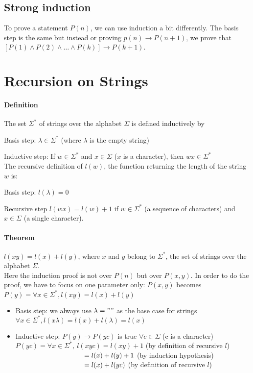 \documentclass[10pt,a4paper]{book}
\begin{document}
\subsection{Strong induction}
To prove a statement $P(n)$, we can use induction a bit differently. The basis step is the same but instead or proving $p(n)\to P(n+1)$, we prove that $[P(1)\land P(2)\land\ldots\land P(k)]\to P(k+1)$.
\section{Recursion on Strings}
\paragraph*{Definition}
The set $\Sigma^{*}$ of strings over the alphabet $\Sigma$ is defined inductively by\par
Basis step: $\lambda \in \Sigma^{*}$ (where $\lambda$ is the empty string)\par
Inductive step: If $w \in \Sigma^{*}$ and $x \in \Sigma$ ($x$ is a character), then $wx \in \Sigma^{*}$\\
The recursive definition of $l(w)$, the function returning the length of the string $w$ is:\par
Basis step: $l(\lambda)=0$\par
Recursive step $l(wx)=l(w)+1$ if $w\in \Sigma^{*}$ (a sequence of characters) and $x \in \Sigma$ (a single character).
\paragraph*{Theorem}
$l(xy)=l(x)+l(y)$, where $x$ and $y$ belong to $\Sigma^{*}$, the set of strings over the alphabet $\Sigma$.\\
Here the induction proof is not over $P(n)$ but over $P(x,y)$. In order to do the proof, we have to focus on one parameter only: $P(x,y)$ becomes $P(y)= \forall x \in \Sigma^{*}, l(xy)=l(x)+l(y)$
\begin{itemize}
\item Basis step: we always use $\lambda = ""$ as the base case for strings\\
$\forall x \in \Sigma^{*}, l(x\lambda) = l(x)+l(\lambda) = l(x)$
\item Inductive step: $P(y) \to P(yc)$ is true $\forall c \in \Sigma$ (c is a character)\\
$P(yc) = \forall x \in \Sigma^{*},\ l(xyc) = l(xy) + 1$ (by definition of recursive $l$)\\
$\hspace*{100pt} = l(x) + l(y) +1$ (by induction hypothesis)\\
$\hspace*{100pt} = l(x) + l(yc)$ (by definition of recursive $l$)
\end{itemize}
\end{document}
